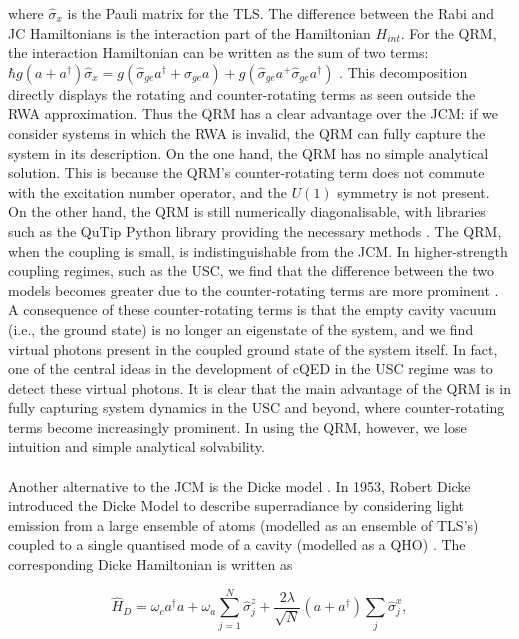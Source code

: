 \documentclass[12pt,a4paper]{article}
\begin{document}
where $\hat{\sigma}_{x}$ is the Pauli matrix for the TLS. The difference between the Rabi and JC Hamiltonians is the interaction part of the Hamiltonian $H_{int}$. For the QRM, the interaction Hamiltonian can be written as the sum of two terms:
$\hbar g(a + a^\dagger)\hat{\sigma}_{x} = g(\hat{\sigma}_{ge}a^\dagger+\hat{\sigma}_{ge}a) + g(\hat{\sigma}_{ge}a^+\hat{\sigma}_{ge}a^\dagger)$ \cite{Hamiltonian2017-Rabi}. This decomposition directly displays the rotating and counter-rotating terms as seen outside the RWA approximation. Thus the QRM has a clear advantage over the JCM: if we consider systems in which the RWA is invalid, the QRM can fully capture the system in its description. On the one hand, the QRM has no simple analytical solution. This is because the QRM's counter-rotating term does not commute with the excitation number operator, and the $U(1)$ symmetry is not present. On the other hand, the QRM is still numerically diagonalisable, with libraries such as the QuTip Python library providing the necessary methods \cite{General2024-JCM_relevance}. 
The QRM, when the coupling is small, is indistinguishable from the JCM. In higher-strength coupling regimes, such as the USC, we find that the difference between the two models becomes greater due to the counter-rotating terms are more prominent \cite{General2024-JCM_relevance}. A consequence of these counter-rotating terms is that the empty cavity vacuum (i.e., the ground state) is no longer an eigenstate of the system, and we find virtual photons present in the coupled ground state of the system itself. In fact, one of the central ideas in the development of cQED in the USC regime was to detect these virtual photons. It is clear that the main advantage of the QRM is in fully capturing system dynamics in the USC and beyond, where counter-rotating terms become increasingly prominent. In using the QRM, however, we lose intuition and simple analytical solvability.\\
\\
Another alternative to the JCM is the Dicke model \cite{Context1954-Dicke}. In 1953, Robert Dicke introduced the Dicke Model to describe superradiance by considering light emission from a large ensemble of atoms (modelled as an ensemble of TLS's) coupled to a single quantised mode of a cavity (modelled as a QHO) \cite{Hamiltonian2019-Dicke}. The corresponding Dicke Hamiltonian is written as 

\begin{equation}
    \hat{H}_D = \omega_ca^\dagger a  +\omega_a\sum^N_{j=1}\hat{\sigma}_j^z + \frac{2\lambda}{\sqrt{N}}(a + a^\dagger)\sum_j\hat{\sigma}_j^x,
\end{equation}
\end{document}
